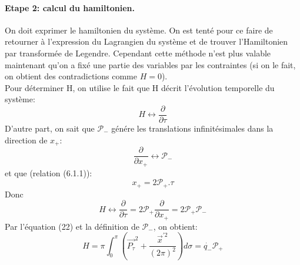 \documentclass[a4paper,12pt]{article}
\def\vecx{\vec{x}}
\def\CP{\mathcal{P}}
\def\pt{P_\tau}
\def\vecpt{\vec{\pt}}
\begin{document}
\paragraph*{Etape 2: calcul du hamiltonien.}
On doit exprimer le hamiltonien du système. On est tenté pour ce faire de retourner à l'expression du Lagrangien du système et de trouver l'Hamiltonien par transformée de Legendre. Cependant cette méthode n'est plus valable maintenant qu'on a fixé une partie des variables par les contraintes (si on le fait, on obtient des contradictions comme $H=0$).\\
Pour déterminer H, on utilise le fait que H décrit l'évolution temporelle du système:
$$H \leftrightarrow \frac{\partial}{\partial \tau}$$
D'autre part, on sait que $\CP_-$ génére les translations infinitésimales dans la direction de $x_+$: $$\frac{\partial}{\partial x_+}\leftrightarrow \CP_-$$
et que (relation (6.1.1)): $$x_+=2\CP_+.\tau$$ Donc $$H \leftrightarrow \frac{\partial}{\partial \tau}=2\CP_+\frac{\partial}{\partial x_+}=2\CP_+\CP_- $$
Par l'équation (22) et la définition de $\CP_-$, on obtient: $$H=\pi\int_0^\pi\left( \vecpt^2 +\frac{\vecx^{'2}}{(2\pi)^2}\right)d\sigma=\dot{q_-}\CP_+ $$
\end{document}
